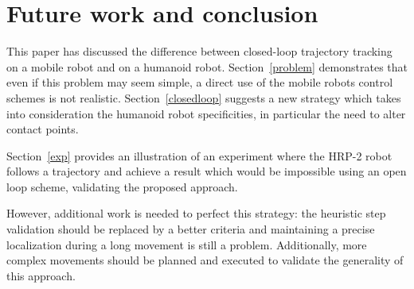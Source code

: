 \section{Future work and conclusion}


This paper has discussed the difference between closed-loop trajectory
tracking on a mobile robot and on a humanoid
robot. Section~\ref{problem} demonstrates that even if this problem
may seem simple, a direct use of the mobile robots control schemes is
not realistic.  Section~\ref{closedloop} suggests a new strategy which
takes into consideration the humanoid robot specificities, in
particular the need to alter contact points.


Section~\ref{exp} provides an illustration of an experiment where the
HRP-2 robot follows a trajectory and achieve a result which would be
impossible using an open loop scheme, validating the proposed
approach.


However, additional work is needed to perfect this strategy: the
heuristic step validation should be replaced by a better criteria and
maintaining a precise localization during a long movement is still a
problem. Additionally, more complex movements should be planned and
executed to validate the generality of this approach.

